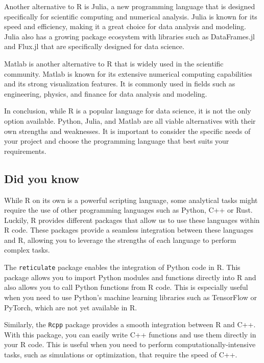 \documentclass[
]{book}
\begin{document}
Another alternative to R is Julia, a new programming language that is designed specifically for scientific computing and numerical analysis. Julia is known for its speed and efficiency, making it a great choice for data analysis and modeling. Julia also has a growing package ecosystem with libraries such as DataFrames.jl and Flux.jl that are specifically designed for data science.

Matlab is another alternative to R that is widely used in the scientific community. Matlab is known for its extensive numerical computing capabilities and its strong visualization features. It is commonly used in fields such as engineering, physics, and finance for data analysis and modeling.

In conclusion, while R is a popular language for data science, it is not the only option available. Python, Julia, and Matlab are all viable alternatives with their own strengths and weaknesses. It is important to consider the specific needs of your project and choose the programming language that best suits your requirements.

\hypertarget{did-you-know}{%
\subsection*{Did you know}\label{did-you-know}}

While R on its own is a powerful scripting language, some analytical tasks might require the use of other programming languages such as Python, C++ or Rust. Luckily, R provides different packages that allow us to use these languages within R code. These packages provide a seamless integration between these languages and R, allowing you to leverage the strengths of each language to perform complex tasks.

The \texttt{reticulate} package enables the integration of Python code in R. This package allows you to import Python modules and functions directly into R and also allows you to call Python functions from R code. This is especially useful when you need to use Python's machine learning libraries such as TensorFlow or PyTorch, which are not yet available in R.

Similarly, the \texttt{Rcpp} package provides a smooth integration between R and C++. With this package, you can easily write C++ functions and use them directly in your R code. This is useful when you need to perform computationally-intensive tasks, such as simulations or optimization, that require the speed of C++.
\end{document}
